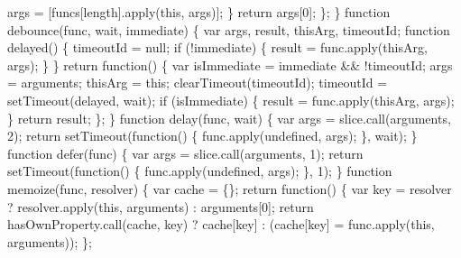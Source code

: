 \begin{DoxyCodeInclude}
{{\textcolor{stringliteral}{        args = [funcs[length].apply(this, args)];}
\textcolor{stringliteral}{      \}}
\textcolor{stringliteral}{      return args[0];}
\textcolor{stringliteral}{    \};}
\textcolor{stringliteral}{  \}}
\textcolor{stringliteral}{}
\textcolor{stringliteral}{  function debounce(func, wait, immediate) \{}
\textcolor{stringliteral}{    var args,}
\textcolor{stringliteral}{        result,}
\textcolor{stringliteral}{        thisArg,}
\textcolor{stringliteral}{        timeoutId;}
\textcolor{stringliteral}{}
\textcolor{stringliteral}{    function delayed() \{}
\textcolor{stringliteral}{      timeoutId = null;}
\textcolor{stringliteral}{      if (!immediate) \{}
\textcolor{stringliteral}{        result = func.apply(thisArg, args);}
\textcolor{stringliteral}{      \}}
\textcolor{stringliteral}{    \}}
\textcolor{stringliteral}{    return function() \{}
\textcolor{stringliteral}{      var isImmediate = immediate && !timeoutId;}
\textcolor{stringliteral}{      args = arguments;}
\textcolor{stringliteral}{      thisArg = this;}
\textcolor{stringliteral}{}
\textcolor{stringliteral}{      clearTimeout(timeoutId);}
\textcolor{stringliteral}{      timeoutId = setTimeout(delayed, wait);}
\textcolor{stringliteral}{}
\textcolor{stringliteral}{      if (isImmediate) \{}
\textcolor{stringliteral}{        result = func.apply(thisArg, args);}
\textcolor{stringliteral}{      \}}
\textcolor{stringliteral}{      return result;}
\textcolor{stringliteral}{    \};}
\textcolor{stringliteral}{  \}}
\textcolor{stringliteral}{}
\textcolor{stringliteral}{  function delay(func, wait) \{}
\textcolor{stringliteral}{    var args = slice.call(arguments, 2);}
\textcolor{stringliteral}{    return setTimeout(function() \{ func.apply(undefined, args); \}, wait);}
\textcolor{stringliteral}{  \}}
\textcolor{stringliteral}{}
\textcolor{stringliteral}{  function defer(func) \{}
\textcolor{stringliteral}{    var args = slice.call(arguments, 1);}
\textcolor{stringliteral}{    return setTimeout(function() \{ func.apply(undefined, args); \}, 1);}
\textcolor{stringliteral}{  \}}
\textcolor{stringliteral}{}
\textcolor{stringliteral}{  function memoize(func, resolver) \{}
\textcolor{stringliteral}{    var cache = \{\};}
\textcolor{stringliteral}{    return function() \{}
\textcolor{stringliteral}{      var key = resolver ? resolver.apply(this, arguments) : arguments[0];}
\textcolor{stringliteral}{      return hasOwnProperty.call(cache, key)}
\textcolor{stringliteral}{        ? cache[key]}
\textcolor{stringliteral}{        : (cache[key] = func.apply(this, arguments));}
\textcolor{stringliteral}{    \};}
}}
\end{DoxyCodeInclude}
